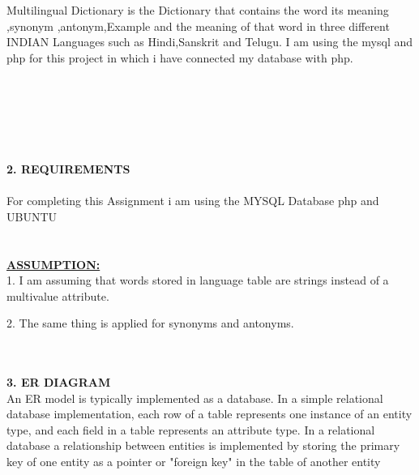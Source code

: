 \documentclass{article}
\begin{document}
\Large Multilingual Dictionary is the Dictionary that contains the word  its meaning ,synonym ,antonym,Example and the meaning of that word in three different INDIAN Languages such as Hindi,Sanskrit and Telugu. I am using the mysql and php for this project in  which i have connected my database with php.\hspace{40}\\
\\
\\
\\
\\
\\
\\
\textbf{\huge 2. REQUIREMENTS}\hspace{20 cm}\\
\\
For completing this Assignment i am  using the MYSQL Database php  and UBUNTU 
\\
\\
\\
 \textbf{\huge \underline{ASSUMPTION:}}\\
 1. I am assuming that words stored in language table are strings instead of a multivalue attribute.

 2. The same thing is  applied for synonyms and antonyms.
 
 \pagebreak


\hline\hspace{20 cm}\\
\\
\textbf{\huge 3. ER DIAGRAM}\\


\Large An   ER   model   is   typically   implemented   as   a   database.   In   a   simple   relational   database implementation, each row of a table represents one instance of an entity type, and each field in a table represents an attribute type. In a relational database a relationship between entities is implemented by storing the primary key of one entity as a pointer or "foreign key" in the table of another entity
\end{document}
